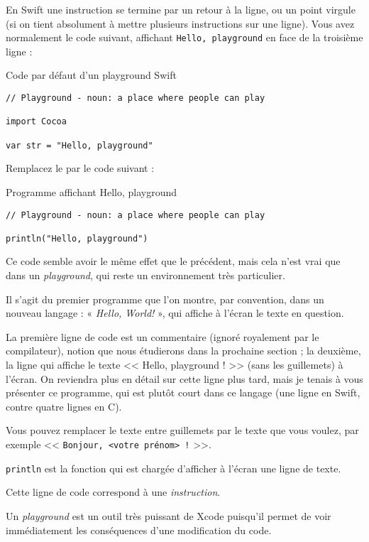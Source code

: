 En Swift une instruction se termine par un retour à la ligne, ou un point virgule
(si on tient absolument à mettre plusieurs instructions sur une ligne).
Vous avez normalement le code suivant,
affichant \verb"Hello, playground" en face de la troisième ligne :
\begin{listing}[H]
\caption{Code par défaut d'un \og playground \fg{} Swift}
\begin{verbatim}
// Playground - noun: a place where people can play

import Cocoa

var str = "Hello, playground"
\end{verbatim}
\end{listing}

Remplacez le par le code suivant :
\begin{listing}[H]
\caption{Programme affichant \og Hello, playground \fg{}}
\begin{verbatim}
// Playground - noun: a place where people can play

println("Hello, playground")
\end{verbatim}
\end{listing}

Ce code semble avoir le même effet que le précédent,
mais cela n'est vrai que dans un \emph{playground},
qui reste un environnement très particulier.

Il s’agit du premier programme que l’on montre,
par convention, dans un nouveau langage :
« \emph{Hello, World!} », qui affiche à l’écran le texte en question.

La première ligne de code est un commentaire
(ignoré royalement par le compilateur),
notion que nous étudierons dans la prochaine section ;
la deuxième, la ligne qui affiche le texte << Hello, playground ! >>
(sans les guillemets) à l’écran.
On reviendra plus en détail sur cette ligne plus tard,
mais je tenais à vous présenter ce programme,
qui est plutôt court dans ce langage
(une ligne en Swift, contre quatre lignes en C).

Vous pouvez remplacer le texte entre guillemets par le texte que vous voulez,
par exemple << \verb"Bonjour, <votre prénom> !" >>.

\texttt{println} est la fonction
qui est chargée d’afficher à l’écran une ligne de texte.

Cette ligne de code correspond à une \emph{instruction}.

Un \emph{playground} est un outil très puissant de Xcode
puisqu’il permet de voir immédiatement
les conséquences d’une modification du code.
